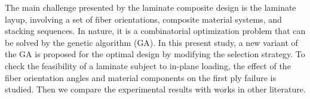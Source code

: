 The main challenge presented by the laminate composite design is the laminate
layup, involving a set of fiber orientations, composite material systems, and
stacking sequences. In nature, it is a combinatorial optimization problem that
can be solved by the genetic algorithm (GA). In this present study, a new
variant of the GA is proposed for the optimal design by modifying the selection
strategy.  To check the feasibility of a laminate subject to in-plane loading,
the effect of the fiber orientation angles and material components on the first
ply failure is studied. Then we compare the experimental results with works in
other literature.
